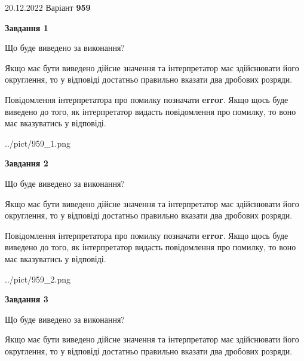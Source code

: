 \documentclass[12pt, ukrainian]{article}
\begin{document}
{20.12.2022 Варіант \No \textbf { 959 }\par}
{
\begin {Large}

{\begin {center}\textbf{Завдання 1}\end {center}}\par
Що буде виведено за виконання? \par

Якщо має бути виведено дійсне значення та інтерпретатор має здійснювати його округлення, 
то у відповіді достатньо правильно вказати два дробових розряди.

Повідомлення інтерпретатора про помилку позначати \textbf{error}.
Якщо щось буде виведено до того, як інтерпретатор видасть повідомлення про помилку, 
то воно має вказуватись у відповіді. \par

\begin{center}
	{../pict/959_1.png}
\end{center}
\newpage

{\begin {center}\textbf{Завдання 2}\end {center}}\par
Що буде виведено за виконання? \par

Якщо має бути виведено дійсне значення та інтерпретатор має здійснювати його округлення, 
то у відповіді достатньо правильно вказати два дробових розряди.

Повідомлення інтерпретатора про помилку позначати \textbf{error}.
Якщо щось буде виведено до того, як інтерпретатор видасть повідомлення про помилку, 
то воно має вказуватись у відповіді. \par

\begin{center}
	{../pict/959_2.png}
\end{center}
\newpage

{\begin {center}\textbf{Завдання 3}\end {center}}\par
Що буде виведено за виконання? \par

Якщо має бути виведено дійсне значення та інтерпретатор має здійснювати його округлення, 
то у відповіді достатньо правильно вказати два дробових розряди.


\end{Large}}
\end{document}
